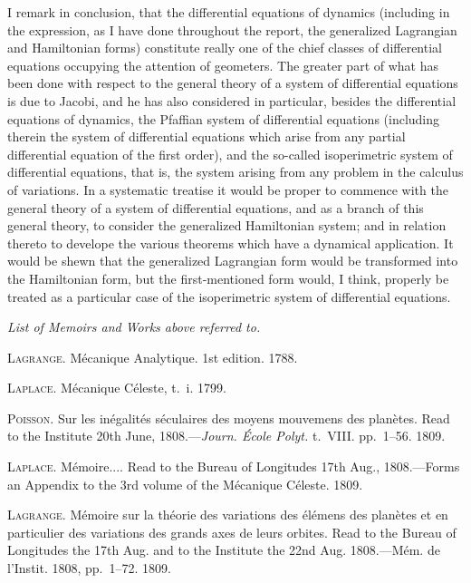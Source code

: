 \documentclass[11pt,a4paper]{book}
\begin{document}
I remark in conclusion, that the differential equations of dynamics (including in
the expression, as I have done throughout the report, the generalized Lagrangian and
Hamiltonian forms) constitute really one of the chief classes of differential equations
occupying the attention of geometers. The greater part of what has been done with
respect to the general theory of a system of differential equations is due to Jacobi,
and he has also considered in particular, besides the differential equations of dynamics,
the Pfaffian system of differential equations (including therein the system of differential
equations which arise from any partial differential equation of the first order), and
the so-called isoperimetric system of differential equations, that is, the system arising
from any problem in the calculus of variations. In a systematic treatise it would be
proper to commence with the general theory of a system of differential equations, and
as a branch of this general theory, to consider the generalized Hamiltonian system;
and in relation thereto to develope the various theorems which have a dynamical
application. It would be shewn that the generalized Lagrangian form would be transformed
into the Hamiltonian form, but the first-mentioned form would, I think,
properly be treated as a particular case of the isoperimetric system of differential
equations.

\bigskip

\begin{center}
\textit{List of Memoirs and Works above referred to.}
\end{center}

\medskip

\noindent\textsc{Lagrange}. M\'ecanique Analytique. 1st edition. 1788.

\smallskip

\noindent\textsc{Laplace}. M\'ecanique C\'eleste, t.~i. 1799.

\smallskip

\noindent\textsc{Poisson}. Sur les in\'egalit\'es s\'eculaires des moyens mouvemens des plan\`etes. Read to
the Institute 20th June, 1808.---\textit{Journ. \'Ecole Polyt.} t.~VIII. pp.~1--56. 1809.

\smallskip

\noindent\textsc{Laplace}. M\'emoire.... Read to the Bureau of Longitudes 17th Aug., 1808.---Forms
an Appendix to the 3rd volume of the M\'ecanique C\'eleste. 1809.

\smallskip

\noindent\textsc{Lagrange}. M\'emoire sur la th\'eorie des variations des \'el\'emens des plan\`etes et en
particulier des variations des grands axes de leurs orbites. Read to the Bureau
of Longitudes the 17th Aug. and to the Institute the 22nd Aug. 1808.---M\'em.
de l'Instit. 1808, pp.~1--72. 1809.
\end{document}
